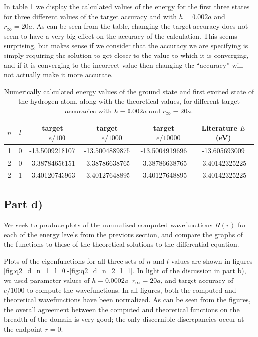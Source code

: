\documentclass{article}
\begin{document}
In table \ref{tab:2b_iiii} we display the calculated values of the energy for the first three states for three different values of the target accuracy and with $h=0.002a$ and $r_\infty=20a$. As can be seen from the table, changing the target accuracy does not seem to have a very big effect on the accuracy of the calculation. This seems surprising, but makes sense if we consider that the accuracy we are specifying is simply requiring the solution to get closer to the value to which it is converging, and if it is converging to the incorrect value then changing the ``accuracy'' will not actually make it more accurate.

\begin{table}[H]
	\centering
	\caption{Numerically calculated energy values of the ground state and first excited state of the hydrogen atom, along with the theoretical values, for different target accuracies with $h=0.002a$ and $r_\infty=20a$.}
	\label{tab:2b_iiii}
	\begin{tabular}{c|c|c|c|c|c}
		$n$ & $l$ & target$=e/100$ & target$=e/1000$ & target$=e/10000$ & Literature $E$ (eV) \\
		\hline
		1 & 0 & -13.5009218107 & -13.5004889875 & -13.5004919696 & -13.605693009 \\
		2 & 0 & -3.38784656151 & -3.38786638765 & -3.38786638765 & -3.40142325225 \\
		2 & 1 & -3.40120743963 & -3.40127648895 & -3.40127648895 & -3.40142325225 \\
	\end{tabular}
\end{table}

\subsection{Part d)}

We seek to produce plots of the normalized computed wavefunctions $R(r)$ for each of the energy levels from the previous section, and compare the graphs of the functions to those of the theoretical solutions to the differential equation.

Plots of the eigenfunctions for all three sets of $n$ and $l$ values are shown in figures \ref{fig:q2_d_n=1_l=0}-\ref{fig:q2_d_n=2_l=1}. In light of the discussion in part b), we used parameter values of $h=0.0002a$, $r_\infty=20a$, and target accuracy of  $e/1000$ to compute the wavefunctions. In all figures, both the computed and theoretical wavefunctions have been normalized. As can be seen from the figures, the overall agreement between the computed and theoretical functions on the breadth of the domain is very good; the only discernible discrepancies occur at the endpoint $r=0$.
\end{document}
